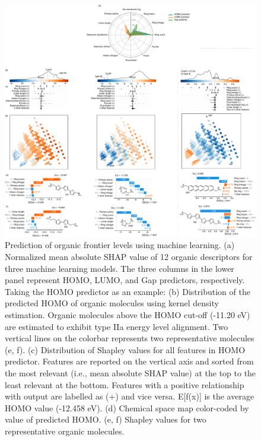 \clearpage
\begin{figure}[!ht]
\centering
\includegraphics[width=\textwidth]{figures/machine-learning/machine-learning-4.pdf}
\caption[Prediction of organic frontier levels using machine learning.]{Prediction of organic frontier levels using machine learning. (a) Normalized mean absolute SHAP value of 12 organic descriptors for three machine learning models. The three columns in the lower panel represent HOMO, LUMO, and Gap predictors, respectively. Taking the HOMO predictor as an example: (b) Distribution of the predicted HOMO of organic molecules using kernel density estimation. Organic molecules above the HOMO cut-off (-11.20 eV) are estimated to exhibit type IIa energy level alignment. Two vertical lines on the colorbar represents two representative molecules (e, f). (c) Distribution of Shapley values for all features in HOMO predictor. Features are reported on the vertical axis and sorted from the most relevant (i.e., mean absolute SHAP value) at the top to the least relevant at the bottom. Features with a positive relationship with output are labelled as (+) and vice versa. E[f(x)] is the average HOMO value (-12.458 eV). (d) Chemical space map color-coded by value of predicted HOMO. (e, f) Shapley values for two representative organic molecules.}
\label{f:machinelearning4}
\end{figure}

